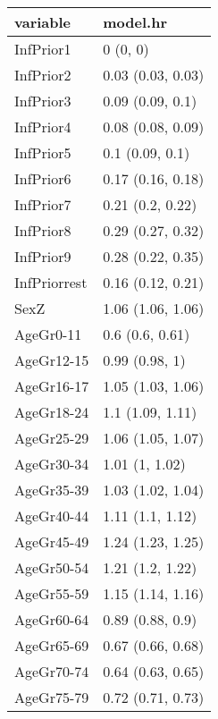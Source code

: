 \begin{table}[ht]
\centering
\begin{tabular}{ll}
  \hline
variable & model.hr \\ 
  \hline
InfPrior1 & 0 (0, 0) \\ 
  InfPrior2 & 0.03 (0.03, 0.03) \\ 
  InfPrior3 & 0.09 (0.09, 0.1) \\ 
  InfPrior4 & 0.08 (0.08, 0.09) \\ 
  InfPrior5 & 0.1 (0.09, 0.1) \\ 
  InfPrior6 & 0.17 (0.16, 0.18) \\ 
  InfPrior7 & 0.21 (0.2, 0.22) \\ 
  InfPrior8 & 0.29 (0.27, 0.32) \\ 
  InfPrior9 & 0.28 (0.22, 0.35) \\ 
  InfPriorrest & 0.16 (0.12, 0.21) \\ 
  SexZ & 1.06 (1.06, 1.06) \\ 
  AgeGr0-11 & 0.6 (0.6, 0.61) \\ 
  AgeGr12-15 & 0.99 (0.98, 1) \\ 
  AgeGr16-17 & 1.05 (1.03, 1.06) \\ 
  AgeGr18-24 & 1.1 (1.09, 1.11) \\ 
  AgeGr25-29 & 1.06 (1.05, 1.07) \\ 
  AgeGr30-34 & 1.01 (1, 1.02) \\ 
  AgeGr35-39 & 1.03 (1.02, 1.04) \\ 
  AgeGr40-44 & 1.11 (1.1, 1.12) \\ 
  AgeGr45-49 & 1.24 (1.23, 1.25) \\ 
  AgeGr50-54 & 1.21 (1.2, 1.22) \\ 
  AgeGr55-59 & 1.15 (1.14, 1.16) \\ 
  AgeGr60-64 & 0.89 (0.88, 0.9) \\ 
  AgeGr65-69 & 0.67 (0.66, 0.68) \\ 
  AgeGr70-74 & 0.64 (0.63, 0.65) \\ 
  AgeGr75-79 & 0.72 (0.71, 0.73) \\ 
   \hline
\end{tabular}
\end{table}
